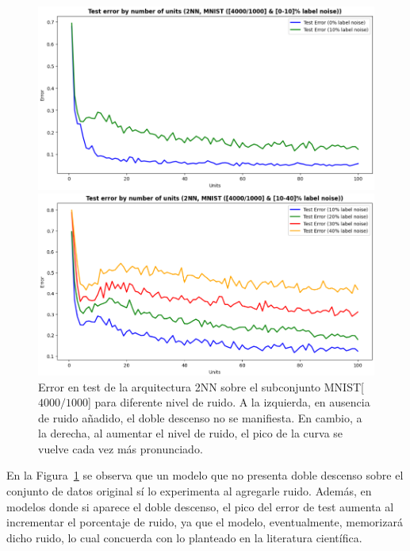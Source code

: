 \begin{figure}[h]
    \centering
    \begin{minipage}{0.45\textwidth}
        \centering
        \includegraphics[width=\linewidth]{img/experiments/noise-wise-dd1.png}
    \end{minipage}
    \begin{minipage}{0.45\textwidth}
        \centering
        \includegraphics[width=\linewidth]{img/experiments/noise-wise-dd2.png}
    \end{minipage}
    \caption[Doble descenso para distintos niveles de ruido.]{Error en test de la arquitectura 2NN sobre el subconjunto MNIST[$4000/1000$] para diferente nivel de ruido. A la izquierda, en ausencia de ruido añadido, el doble descenso no se manifiesta. En cambio, a la derecha, al aumentar el nivel de ruido, el pico de la curva se vuelve cada vez más pronunciado.}\label{fig:noise-wise-dd}
\end{figure}

En la Figura~\ref{fig:noise-wise-dd} se observa que un modelo que no presenta doble descenso sobre el conjunto de datos original sí lo experimenta al agregarle ruido. Además, en modelos donde si aparece el doble descenso, el pico del error de test aumenta al incrementar el porcentaje de ruido, ya que el modelo, eventualmente, memorizará dicho ruido, lo cual concuerda con lo planteado en la literatura científica.\newline

